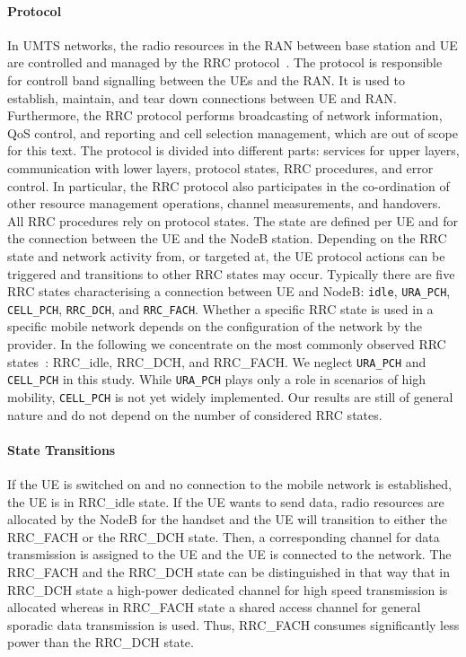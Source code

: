 \paragraph*{ Protocol} In \gls{UMTS} networks, the radio resources in the \gls{RAN} between base station and UE are controlled and managed by the \gls{RRC} protocol~\cite{3GPP_RRC_Spec}.
The protocol is responsible for controll band signalling between the \glspl{UE} and the \gls{RAN}.
It is used to establish, maintain, and tear down connections between \gls{UE} and \gls{RAN}.
Furthermore, the \gls{RRC} protocol performs broadcasting of network information, \gls{QoS} control, and reporting and cell selection management, which are out of scope for this text.
The protocol is divided into different parts: services for upper layers, communication with lower layers, protocol states, \gls{RRC} procedures, and error control.
In particular, the \gls{RRC} protocol also participates in the co-ordination of other resource management operations, channel measurements, and handovers.
All \gls{RRC} procedures rely on protocol states. 
The state are defined per \gls{UE} and for the connection between the \gls{UE} and the \gls{NodeB} station.
Depending on the \gls{RRC} state and network activity from, or targeted at, the \gls{UE} protocol actions can be triggered and transitions to other \gls{RRC} states may occur.
Typically there are five \gls{RRC} states characterising a connection between \gls{UE} and \gls{NodeB}: \texttt{idle}, \texttt{URA\_PCH}, \texttt{CELL\_PCH}, \texttt{RRC\_DCH}, and \texttt{RRC\_FACH}.
Whether a specific \gls{RRC} state is used in a specific mobile network depends on the configuration of the network by the provider.
In the following we concentrate on the most commonly observed \gls{RRC} states~\cite{Qian2010a}: \gls{RRC_idle}, \gls{RRC_DCH}, and \gls{RRC_FACH}.
We neglect \texttt{URA\_PCH} and \texttt{CELL\_PCH} in this study.
While \texttt{URA\_PCH} plays only a role in scenarios of high mobility, \texttt{CELL\_PCH} is not yet widely implemented. 
Our results are still of general nature and do not depend on the number of considered \gls{RRC} states.

\paragraph*{ State Transitions} If the \gls{UE} is switched on and no connection to the mobile network is established, the \gls{UE} is in \gls{RRC_idle} state.
If the \gls{UE} wants to send data, radio resources are allocated by the \gls{NodeB} for the handset and the \gls{UE} will transition to either the \gls{RRC_FACH} or the \gls{RRC_DCH} state. 
Then, a corresponding channel for data transmission is assigned to the \gls{UE} and the \gls{UE} is connected to the network.
The \gls{RRC_FACH} and the \gls{RRC_DCH} state can be distinguished in that way that in \gls{RRC_DCH} state a high-power dedicated channel for high speed transmission is allocated whereas in \gls{RRC_FACH} state a shared access channel for general sporadic data transmission is used.
Thus, \gls{RRC_FACH} consumes significantly less power than the \gls{RRC_DCH} state. 

